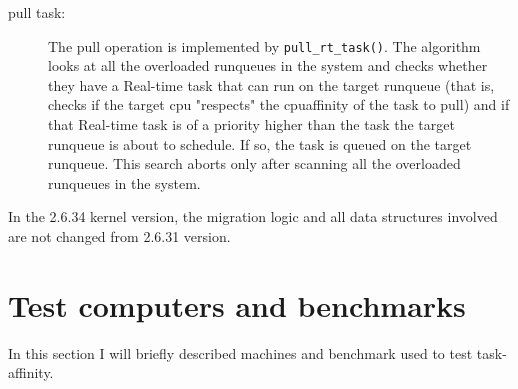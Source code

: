 \begin{description}
\item[pull task:] The pull operation is implemented by \texttt{pull\_rt\_task()}. The algorithm looks at all the overloaded runqueues in the system 
and checks whether they have a Real-time task that can run on the target runqueue (that is, checks if the target cpu "respects" the cpuaffinity of the 
task to pull) and if that Real-time task is of a priority higher than the task the target runqueue is about to schedule. If so, the task is queued on 
the target runqueue. This search aborts only after scanning all the overloaded runqueues in the system. 

\end{description}

In the 2.6.34 kernel version, the migration logic and all data structures involved are not changed from 2.6.31 version.

\section{Test computers and benchmarks}

In this section I will briefly described machines and benchmark used to test task-affinity.

\begin{figure}[htbp]
 \centering%
  \qquad\qquad
 \caption{}
\end{figure}

